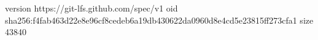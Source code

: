 version https://git-lfs.github.com/spec/v1
oid sha256:f4fab463d22e8e96cf8cedeb6a19db430622da0960d8e4cd5e23815ff273cfa1
size 43840
